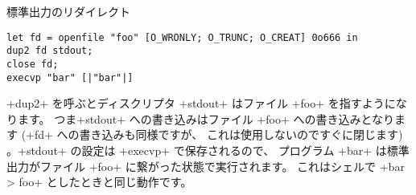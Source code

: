 \begin{example}
標準出力のリダイレクト
%
\begin{lstlisting}
let fd = openfile "foo" [O_WRONLY; O_TRUNC; O_CREAT] 0o666 in
dup2 fd stdout;
close fd;
execvp "bar" [|"bar"|]
\end{lstlisting}
%
\ml+dup2+ を呼ぶとディスクリプタ \ml+stdout+ はファイル \ml+foo+ を指すようになります。
つま\ml+stdout+ への書き込みはファイル \ml+foo+ への書き込みとなります (\ml+fd+ への書き込みも同様ですが、
これは使用しないのですぐに閉じます) 。\ml+stdout+ の設定は \ml+execvp+ で保存されるので、
プログラム \ml+bar+ は標準出力がファイル \ml+foo+ に繋がった状態で実行されます。
これはシェルで \ml+bar > foo+ としたときと同じ動作です。

\end{example}

